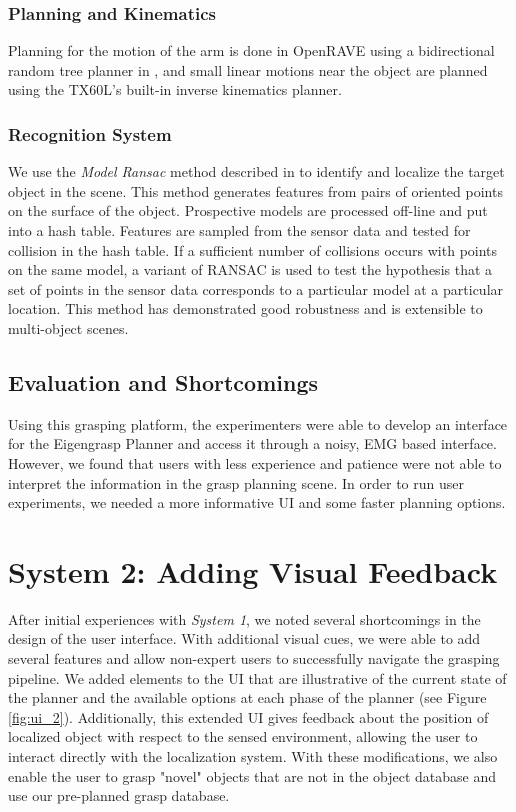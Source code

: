 \subsubsection{Planning and Kinematics}
Planning for the motion of the arm is done in OpenRAVE using a bidirectional random tree planner in \cite{berenson-cbirrt}, and small linear motions near the object are planned using the TX60L's built-in inverse kinematics planner.

\subsubsection{Recognition System}
\label{sec:rec_system}
 We use the \emph{Model Ransac} method described in \cite{EfficientModelRansac} to identify and localize the target object in the scene. This method generates features from pairs of oriented points on the surface of the object. Prospective models are processed off-line and put into a hash table. Features are sampled from the sensor data and tested for collision in the hash table. If a sufficient number of collisions occurs with points on the same model, a variant of RANSAC is used to test the hypothesis that a set of points in the sensor data corresponds to a particular model at a particular location. This method has demonstrated good robustness and is extensible to multi-object scenes. 

\subsection{Evaluation and Shortcomings}
Using this grasping platform, the experimenters were able to develop an interface for the Eigengrasp Planner and access it through a noisy, EMG based interface. However, we found that users with less experience and patience were not able to interpret the information in the grasp planning scene. In order to run user experiments, we needed a more informative UI and some faster planning options.

\section*{System 2: Adding Visual Feedback}
\setcounter{subsection}{0}
\renewcommand*{\theHsection}{chX.\the\value{section}}
After initial experiences with \emph{System 1}, we noted several shortcomings in the design of the user interface. With additional visual cues, we were able to add several features and allow non-expert users to successfully navigate the grasping pipeline. We added elements to the UI that are illustrative of the current state of the planner and the available options at each phase of the planner (see Figure \ref{fig:ui_2}). Additionally, this extended UI gives feedback about the position of localized object with respect to the sensed environment, allowing the user to interact directly with the localization system. With these modifications, we also enable the user to grasp "novel" objects that are not in the object database and use our pre-planned grasp database. 


